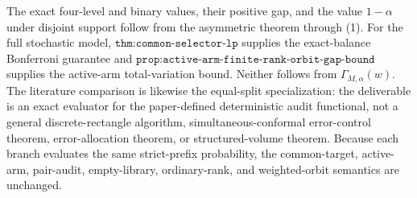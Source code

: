 The exact four-level and binary values, their positive gap, and the value \(1-\alpha\) under disjoint support follow from the asymmetric theorem through (1). For the full stochastic model, \(\texttt{thm:common-selector-lp}\) supplies the exact-balance Bonferroni guarantee and \(\texttt{prop:active-arm-finite-rank-orbit-gap-bound}\) supplies the active-arm total-variation bound. Neither follows from \(\Gamma_{M,\alpha}(w)\). The literature comparison is likewise the equal-split specialization: the deliverable is an exact evaluator for the paper-defined deterministic audit functional, not a general discrete-rectangle algorithm, simultaneous-conformal error-control theorem, error-allocation theorem, or structured-volume theorem. Because each branch evaluates the same strict-prefix probability, the common-target, active-arm, pair-audit, empty-library, ordinary-rank, and weighted-orbit semantics are unchanged.